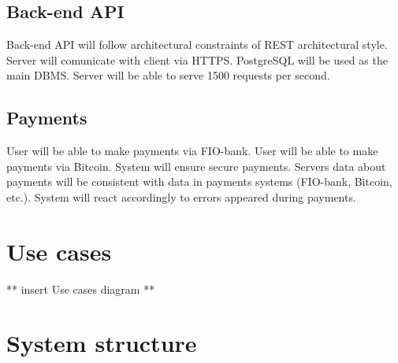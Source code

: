 \subsection{Back-end \ac{API}}
Back-end API will follow architectural constraints of REST architectural style.
Server will comunicate with client via \ac{HTTPS}.
PostgreSQL will be used as the main DBMS.
Server will be able to serve 1500 requests per second.

\subsection{Payments}
User will be able to make payments via FIO-bank.
User will be able to make payments via Bitcoin.
System will ensure secure payments.
Servers data about payments will be consistent with data in payments systems (FIO-bank, Bitcoin, etc.).
System will react accordingly to errors appeared during payments.

\section{Use cases}
** insert Use cases diagram **



\section{System structure}


